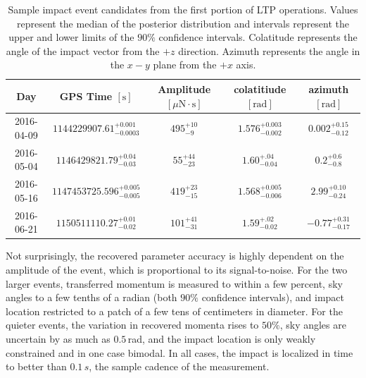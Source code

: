 \documentclass[a4paper]{jpconf}
\begin{document}
\begin{table}[h!]
\caption{\label{tab:candidates}Sample impact event candidates from the first portion of LTP operations. Values represent the median of the posterior distribution and intervals represent the upper and lower limits of the $90\%$ confidence intervals. Colatitude represents the angle of the impact vector from the $+z$ direction. Azimuth represents the angle in the $x-y$ plane from the $+x$ axis.}
\begin{center}
\begin{tabular}{|c|c|c|c|c|}
\hline
Day & GPS Time $\left[\textrm{s}\right]$ & Amplitude $\left[\mu\textrm{N}\cdot\textrm{s}\right]$ & colatitiude $\left[\textrm{rad}\right]$ & azimuth $\left[\textrm{rad}\right]$ \\
\hline
 2016-04-09 & $1144229907.61^{+0.001}_{-0.0003}$ & $495^{+10}_{-9}$ & $1.576^{+0.003}_{-0.002}$ & $0.002^{+0.15}_{-0.12}$ \\
  2016-05-04 & $1146429821.79^{+0.04}_{-0.03}$ & $55^{+44}_{-23}$ & $1.60^{+.04}_{-0.04}$ & $0.2^{+0.6}_{-0.8}$ \\
   2016-05-16 & $1147453725.596^{+0.005}_{-0.005}$ & $419^{+23}_{-15}$ & $1.568^{+0.005}_{-0.006}$ & $2.99^{+0.10}_{-0.24}$ \\
    2016-06-21 & $1150511110.27^{+0.01}_{-0.02}$ & $101^{+41}_{-31}$ & $1.59^{+.02}_{-0.02}$ & $-0.77^{+0.31}_{-0.17}$ \\
\hline
\end{tabular}
\end{center}
\label{default}
\end{table}%

Not surprisingly, the recovered parameter accuracy is highly dependent on the amplitude of the event, which is proportional to its signal-to-noise. For the two larger events, transferred momentum is measured to within a few percent, sky angles to a few tenths of a radian  (both $90\%$ confidence intervals), and impact location restricted to a patch of a few tens of centimeters in diameter. For the quieter events, the variation in recovered momenta rises to $50\%$, sky angles are uncertain by as much as $0.5\,$rad, and the impact location is only weakly constrained and in one case bimodal. In all cases, the impact is localized in time to better than $0.1\,s$, the sample cadence of the measurement.
\end{document}
